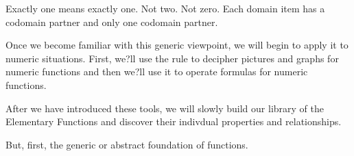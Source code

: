 \documentclass{ximera}
\begin{document}
Exactly one means exactly one.  Not two. Not zero. Each domain item has a codomain partner and only one codomain partner.

Once we become familiar with this generic viewpoint, we will begin to apply it to numeric situations.  First, we?ll use the rule to decipher pictures and graphs for numeric functions and then we?ll use it to operate formulas for numeric functions.

After we have introduced these tools, we will slowly build our library of the Elementary Functions and discover their indivdual properties and relationships.

But, first, the generic or abstract foundation of functions.
\end{document}

